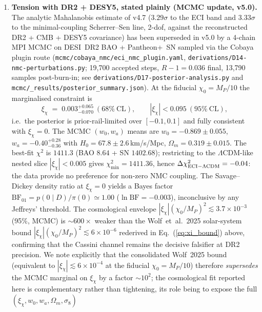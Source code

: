 \begin{enumerate}
  tension discussed below. See \texttt{derivations/D10-report.md} for the full cross-check.
\item \textbf{Tension with DR2 + DESY5, stated plainly (MCMC update, v5.0).}
  The analytic Mahalanobis estimate of v4.7 ($3.29\sigma$ to the ECI band and
  $3.33\sigma$ to the minimal-coupling Scherrer--Sen line, 2-dof, against the
  reconstructed DR2 + CMB + DESY5 covariance) has been superseded in v5.0 by a
  4-chain MPI MCMC on DESI~DR2 BAO + Pantheon+~SN sampled via the Cobaya plugin
  route (\texttt{mcmc/cobaya\_nmc/eci\_nmc\_plugin.yaml},
  \texttt{derivations/D14-nmc-perturbations.py};
  19{,}700 accepted steps, $R-1=0.036$ final, 13{,}790 samples post-burn-in;
  see \texttt{derivations/D17-posterior-analysis.py} and
  \texttt{mcmc/\_results/posterior\_summary.json}). At the fiducial
  $\chi_0=M_P/10$ the marginalised constraint is
  \begin{equation}
    \xi_\chi \;=\; 0.003^{+0.065}_{-0.070}\ (68\%~\mathrm{CL})
    ,\qquad |\xi_\chi|<0.095~(95\%~\mathrm{CL}),
    \label{eq:xi_chi_MCMC}
  \end{equation}
  i.e.\ the posterior is prior-rail-limited over $[-0.1,0.1]$ and fully
  consistent with $\xi_\chi=0$. The MCMC $(w_0,w_a)$ means are
  $w_0=-0.869\pm0.055$, $w_a=-0.40^{+0.28}_{-0.36}$ with
  $H_0=67.8\pm2.6$\,km/s/Mpc, $\Omega_m=0.319\pm0.015$. The best-fit $\chi^2$ is
  $1411.3$ (BAO $8.64$ + SN $1402.68$); restricting to the $\Lambda$CDM-like nested slice
  $|\xi_\chi|<0.005$ gives $\chi^2_{\min}=1411.36$, hence
  $\Delta\chi^2_{\rm ECI-\Lambda CDM}=-0.04$: the data provide no preference for
  non-zero NMC coupling. The Savage--Dickey density ratio at $\xi_\chi=0$ yields
  a Bayes factor $\mathrm{BF}_{01}=p(0\mid D)/\pi(0)\simeq 1.00$
  ($\ln\mathrm{BF}=-0.003$), inconclusive by any Jeffreys' threshold. The
  cosmological envelope $|\xi_\chi|(\chi_0/M_P)^2\lesssim 3.7\times 10^{-3}$
  (95\%, MCMC) is $\sim 600\times$ weaker than the Wolf~et~al.\ 2025
  solar-system bound $|\xi_\chi|(\chi_0/M_P)^2\lesssim 6\times 10^{-6}$
  rederived in Eq.~(\ref{eq:xi_bound}) above, confirming that the Cassini channel
  remains the decisive falsifier at DR2 precision. We note explicitly
  that the consolidated Wolf~2025 bound
  (equivalent to $|\xi_\chi|\lesssim 6\times 10^{-4}$ at the fiducial
  $\chi_0=M_P/10$) therefore \emph{supersedes} the MCMC marginal on
  $\xi_\chi$ by a factor $\sim 10^2$; the cosmological fit reported
  here is complementary rather than tightening, its role being to
  expose the full $(\xi_\chi, w_0, w_a, \Omega_m, \sigma_8)$

\end{enumerate}
